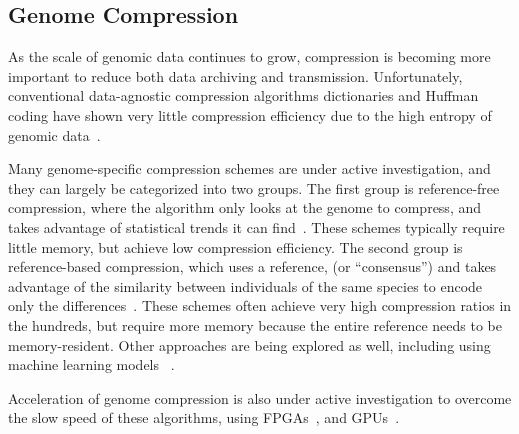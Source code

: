 \subsection{Genome Compression}

As the scale of genomic data continues to grow, compression is becoming more important to reduce both data archiving and transmission.
Unfortunately, conventional data-agnostic compression algorithms dictionaries and Huffman coding have shown very little compression efficiency due to the high entropy of genomic data~\cite{kokot2022colord,mansouri2020newdnacompression}.

Many genome-specific compression schemes are under active investigation, and they can largely be categorized into two groups.
The first group is reference-free compression, where the algorithm only looks at the genome to compress, and takes advantage of statistical trends it can find~\cite{chandak2018spring,kokot2022colord}.
These schemes typically require little memory, but achieve low compression efficiency.
The second group is reference-based compression, which uses a reference, (or ``consensus'') and takes advantage of the similarity between individuals of the same species to encode only the differences~\cite{bonfield2022cram,kokot2022colord}.
These schemes often achieve very high compression ratios in the hundreds, but require more memory because the entire reference needs to be memory-resident.
Other approaches are being explored as well, including using machine learning models ~\cite{silva2020efficientdnann,cui2020compressinggenomedeep,sheena2024gencoder}.

Acceleration of genome compression is also under active investigation to overcome the slow speed of these algorithms, using FPGAs~\cite{arram2015fpgareferencecompressiongenomic,chen2023efficientsequencingcompressionfpga}, and GPUs~\cite{guo2013gpu,amich2020gpu,deluca2022gpu}.

